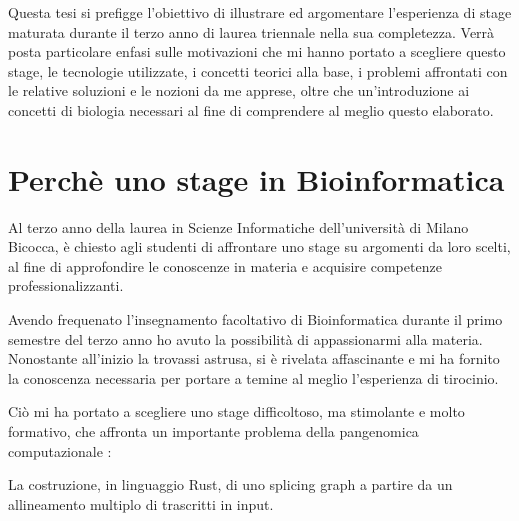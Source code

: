Questa tesi si prefigge l'obiettivo di illustrare ed argomentare l'esperienza di stage maturata durante il terzo anno di laurea triennale nella sua completezza. Verrà posta particolare enfasi sulle motivazioni che mi hanno portato a scegliere questo stage, le tecnologie utilizzate, i concetti teorici alla base, i problemi affrontati con le relative soluzioni e le nozioni da me apprese, oltre che un'introduzione ai concetti di biologia necessari al fine di comprendere al meglio questo elaborato.

\section{Perchè uno stage in Bioinformatica}
Al terzo anno della laurea in Scienze Informatiche dell'università di Milano Bicocca, è chiesto agli studenti di affrontare uno stage su argomenti da loro scelti, al fine di approfondire le conoscenze in materia e acquisire competenze professionalizzanti.


Avendo frequenato l'insegnamento facoltativo di Bioinformatica durante il primo semestre del terzo anno ho avuto la possibilità di appassionarmi alla materia. Nonostante all'inizio la trovassi astrusa, si è rivelata affascinante e mi ha fornito la conoscenza necessaria per portare a temine al meglio l'esperienza di tirocinio.


Ciò mi ha portato a scegliere uno stage difficoltoso, ma stimolante e molto formativo, che affronta un importante problema della pangenomica computazionale : 

La costruzione, in linguaggio Rust, di uno splicing graph a partire da un allineamento multiplo di trascritti in input.